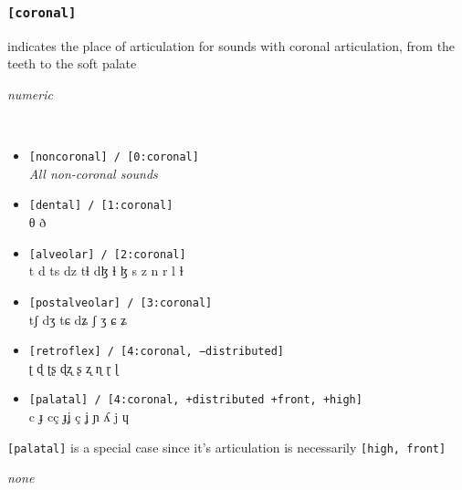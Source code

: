 \documentclass[10pt,letterpaper]{article}
\begin{document}
\subsubsection{\texttt{[coronal]}}
\label{ssub:feature_coronal}
\begin{samepage}
\begin{description}
\itemsep1pt \parskip0pt  
\item[Descritpion] indicates the place of articulation for sounds with coronal articulation, from the teeth to the soft palate
\item[Type] \emph{numeric}
\item[Examples]\
  \begin{itemize}
    \item \texttt{[noncoronal] / [0:coronal]}\\
      \emph{All non-coronal sounds}
    \item \texttt{[dental] / [1:coronal]}\\
      θ ð 
    \item \texttt{[alveolar] / [2:coronal]}\\
      t d ts dz tɬ dɮ ɬ ɮ s z n r l ɫ 
    \item \texttt{[postalveolar] / [3:coronal]}\\
      tʃ dʒ tɕ dʑ ʃ ʒ ɕ ʑ 
    \item \texttt{[retroflex] / [4:coronal, −distributed]}\\
      ʈ ɖ ʈʂ ɖʐ ʂ ʐ ɳ ɽ ɭ 
    \item \texttt{[palatal] / [4:coronal, +distributed +front, +high]}\\
      c ɟ cç ɟʝ ç ʝ ɲ ʎ j ɥ
  \end{itemize}
\item[Constraints] \texttt{[palatal]} is a special case since it's articulation is necessarily \texttt{[high, front]}
\item[Resctrictions] \emph{none}
\end{description}
\end{samepage}
\end{document}
